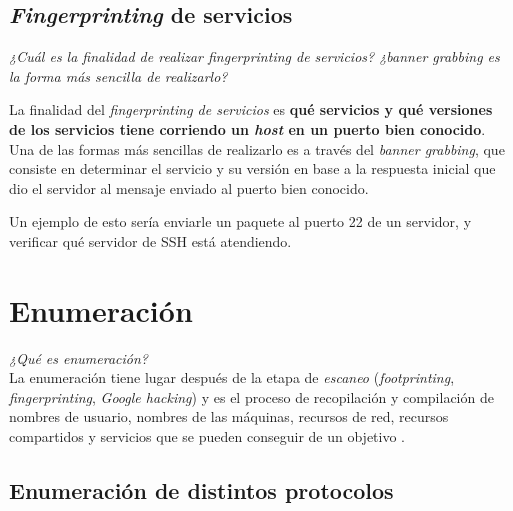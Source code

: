 \subsection{\emph{Fingerprinting} de servicios}

\emph{¿Cuál es la finalidad de realizar fingerprinting de servicios? ¿banner grabbing es la forma más sencilla de realizarlo?} 

La finalidad del \emph{fingerprinting de servicios} es \textbf{qué servicios y qué versiones de los servicios tiene corriendo un \emph{host} en un puerto bien conocido}. Una de las formas más sencillas de realizarlo es a través del \emph{banner grabbing}, que consiste en determinar el servicio y su versión en base a la respuesta inicial que dio el servidor al mensaje enviado al puerto bien conocido.

Un ejemplo de esto sería enviarle un paquete al puerto 22 de un servidor, y verificar qué servidor de SSH está atendiendo.

\section{Enumeración}

\emph{¿Qué es enumeración?} 
~\\

La enumeración tiene lugar después de la etapa de \emph{escaneo} (\emph{footprinting}, \emph{fingerprinting}, \emph{Google hacking}) y es el proceso de recopilación y compilación de nombres de usuario, nombres de las máquinas, recursos de red, recursos compartidos y servicios que se pueden conseguir de un objetivo \autocite{EhackEnumeracion}.  

\subsection{Enumeración de distintos protocolos}

